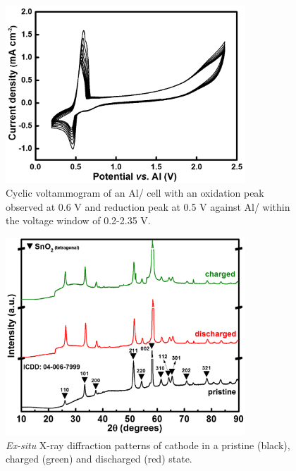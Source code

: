 \begin{figure}[th!]
  \centering
  \includegraphics[width=0.8\textwidth]{Figures/chap6fig/Sno2CV}
    \caption{Cyclic voltammogram of an Al/ cell with an oxidation peak observed at 0.6 V and reduction peak at 0.5 V against Al/ within the voltage window of 0.2-2.35 V.}
  \label{Figures/chap6fig:Sno2CV}
\end{figure}
\begin{figure}[th!]
  \centering
  \includegraphics[width=0.8\textwidth]{Figures/chap6fig/SnO2XRD}
    \caption{\textit{Ex-situ} X-ray diffraction patterns of  cathode in a pristine (black), charged (green) and discharged (red) state.}
  \label{Figures/chap6fig:SnO2XRD}
\end{figure}
